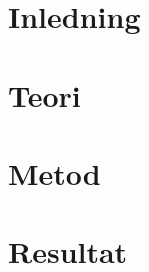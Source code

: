 \documentclass{article}
\begin{document}


\begin{multicols}{2}
\section{Inledning}


\section{Teori}


\section{Metod}


\section{Resultat}





\end{multicols}


\end{document}
